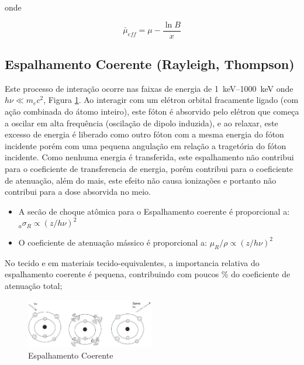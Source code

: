 \documentclass[11pt,a4paper]{article}
\begin{document}
            \noindent onde

                \begin{equation}
                    \bar{\mu}_{eff} = \mu - \frac{\ln B}{x}
                \end{equation}




        \subsection{Espalhamento Coerente (Rayleigh, Thompson)}

            Este processo de interação ocorre nas faixas de energia de \qtyrange{1}{1000}{keV} onde $h\nu \ll m_ec^2$, Figura \ref{fig:espalhamentoCoerente}. Ao interagir com um elétron orbital fracamente ligado (com ação combinada do átomo inteiro), este fóton é absorvido pelo elétron que começa a oscilar em alta frequência (oscilação de dipolo induzida), e ao relaxar, este excesso de energia é liberado como outro fóton com a mesma energia do fóton incidente porém com uma pequena angulação em relação a tragetória do fóton incidente. Como nenhuma energia é transferida, este espalhamento não contribui para o coeficiente de transferencia de energia, porém contribui para o coeficiente de atenuação, além do mais, este efeito não causa ionizações e portanto não contribui para a dose absorvida no meio.

            \begin{itemize}
                \item A secão de choque atômica para o Espalhamento coerente é proporcional a:  ${}_a\sigma_R \propto (z / h\nu)^2$
                \item O coeficiente de atenuação mássico é proporcional a: $\mu_R / \rho \propto (z / h\nu)^2$
            \end{itemize}

            No tecido e em materiais tecido-equivalentes, a importancia relativa do espalhamento coerente é pequena, contribuindo com poucos \% do coeficiente de atenuação total;

            \begin{figure}[h]
                \centering
                \includegraphics[width=0.5\textwidth]{Imagens/espalhamentoCoerente.JPG}
                \caption{Espalhamento Coerente}
                \label{fig:espalhamentoCoerente}
            \end{figure}
\end{document}
